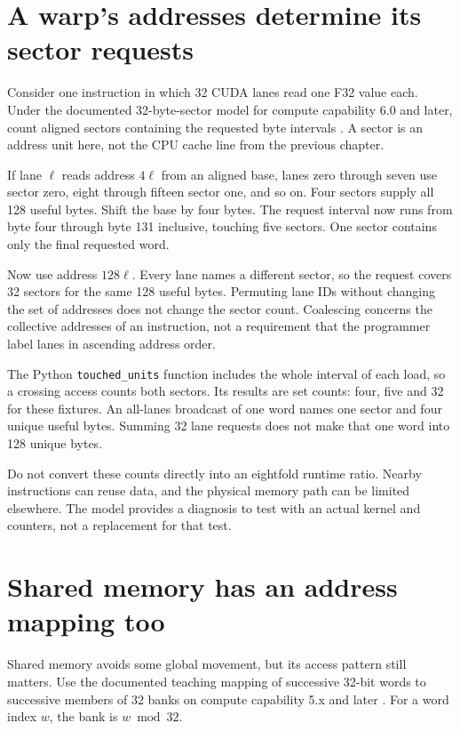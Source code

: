 \section{A warp's addresses determine its sector requests}
Consider one instruction in which 32 CUDA lanes read
one F32 value each. Under the documented 32-byte-sector
model for compute capability 6.0 and later, count aligned
sectors containing the requested byte intervals
\cite{nvidia2026bestpractices}. A sector is an address
unit here, not the CPU cache line from the previous chapter.

If lane $\ell$ reads address $4\ell$ from an aligned
base, lanes zero through seven use sector zero,
eight through fifteen sector one, and so on.
Four sectors supply all 128 useful bytes. Shift the
base by four bytes. The request interval now runs
from byte four through byte 131 inclusive, touching
five sectors. One sector contains only the final
requested word.


Now use address $128\ell$. Every lane names a
different sector, so the request covers 32 sectors
for the same 128 useful bytes. Permuting lane IDs
without changing the set of addresses does not change
the sector count. Coalescing concerns the collective
addresses of an instruction, not a requirement that
the programmer label lanes in ascending address order.

The Python \texttt{touched\_units} function includes the
whole interval of each load, so a crossing access
counts both sectors. Its results are set counts:
four, five and 32 for these fixtures. An all-lanes
broadcast of one word names one sector and four
unique useful bytes. Summing 32 lane requests does
not make that one word into 128 unique bytes.

Do not convert these counts directly into an eightfold
runtime ratio. Nearby instructions can reuse data,
and the physical memory path can be limited elsewhere.
The model provides a diagnosis to test with an actual
kernel and counters, not a replacement for that test.

\section{Shared memory has an address mapping too}
Shared memory avoids some global movement, but its access
pattern still matters. Use the documented teaching
mapping of successive 32-bit words to successive
members of 32 banks on compute capability 5.x and
later \cite{nvidia2026bestpractices}. For a word index
$w$, the bank is $w\bmod32$.

